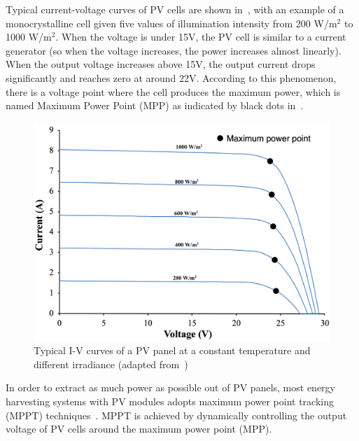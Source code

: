 Typical current-voltage curves of PV cells are shown in~, with an example of a monocrystalline cell given five values of illumination intensity from 200 W/m$^{2}$ to 1000 W/m$^{2}$. When the voltage is under 15V, the PV cell is similar to a current generator (so when the voltage increases, the power increases almost linearly). When the output voltage increases above 15V, the output current drops significantly and reaches zero at around 22V. According to this phenomenon, there is a voltage point where the cell produces the maximum power, which is named Maximum Power Point (MPP) as indicated by black dots in~. 

\begin{figure}
    \centering
    \includegraphics[width=0.9\columnwidth]{ch2_review/figures/solar_iv_pic.png}
    \caption{Typical I-V curves of a PV panel at a constant temperature and different irradiance (adapted from~\cite{ciulla2014comparison})}
    \label{Figure:solar_vi}
\end{figure}

In order to extract as much power as possible out of PV panels, most energy harvesting systems with PV modules adopts maximum power point tracking (MPPT) techniques~\cite{lopez2010new, paz2016high, verma2016maximum}. MPPT is achieved by dynamically controlling the output voltage of PV cells around the maximum power point (MPP).

